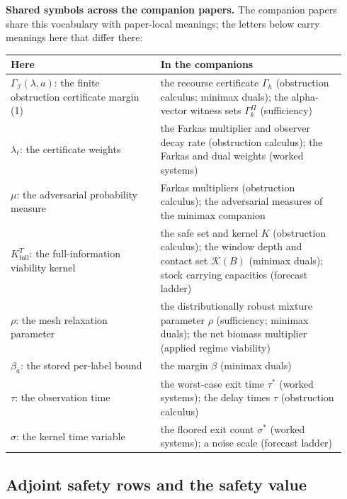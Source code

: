 \documentclass[10pt,twocolumn]{article}
\theoremstyle{plain}
\theoremstyle{definition}
\theoremstyle{remark}
\begin{document}
\medskip
\noindent\textbf{Shared symbols across the companion papers.} The
companion papers share this vocabulary with paper-local meanings; the
letters below carry meanings here that differ there:
\begin{center}\small
\begin{tabular}{@{}p{0.42\linewidth}p{0.52\linewidth}@{}}
\toprule
\textbf{Here} & \textbf{In the companions} \\
\midrule
\(\Gamma_{\mathcal{I}}(\lambda, a)\): the finite obstruction certificate margin (1) & the recourse certificate \(\Gamma_{h}\) (obstruction calculus; minimax duals); the alpha-vector witness sets \(\Gamma^{\Pi}_{k}\) (sufficiency) \\
\(\lambda_{\ell}\): the certificate weights & the Farkas multiplier and observer decay rate (obstruction calculus); the Farkas and dual weights (worked systems) \\
\(\mu\): the adversarial probability measure & Farkas multipliers (obstruction calculus); the adversarial measures of the minimax companion \\
\(K^{T}_{\mathrm{full}}\): the full-information viability kernel & the safe set and kernel \(K\) (obstruction calculus); the window depth and contact set \(\mathcal{K}(B)\) (minimax duals); stock carrying capacities (forecast ladder) \\
\(\rho\): the mesh relaxation parameter & the distributionally robust mixture parameter \(\rho\) (sufficiency; minimax duals); the net biomass multiplier (applied regime viability) \\
\(\beta_{a}\): the stored per-label bound & the margin \(\beta\) (minimax duals) \\
\(\tau\): the observation time & the worst-case exit time \(\tau^{*}\) (worked systems); the delay times \(\tau\) (obstruction calculus) \\
\(\sigma\): the kernel time variable & the floored exit count \(\sigma^{*}\) (worked systems); a noise scale (forecast ladder) \\
\bottomrule
\end{tabular}
\end{center}


\subsection{Adjoint safety rows and the safety value}\label{rows}
\end{document}
